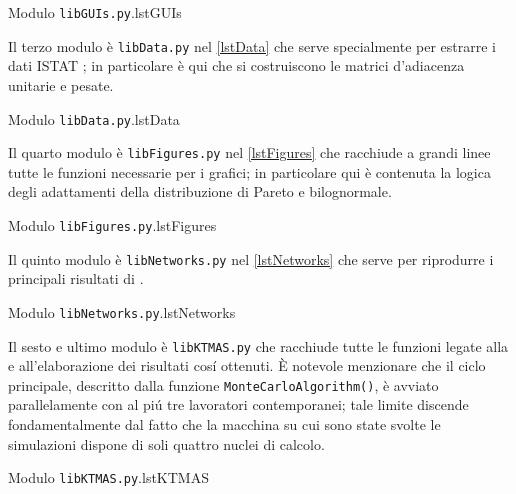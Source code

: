         {\texorpdfstring{Modulo \texttt{libGUIs.py}.}{Modulo «libGUIs.py»}}{lstGUIs}

      Il terzo modulo è \texttt{libData.py} nel \cref{lstData} che serve specialmente per estrarre i dati ISTAT \cite{ISTATCensimento1991,ISTATLimiti1991,ISTATPendolarismo1991}; in particolare è qui che si costruiscono le matrici d'adiacenza unitarie e pesate.
  
        {\texorpdfstring{Modulo \texttt{libData.py}.}{Modulo «libData.py»}}{lstData}

      Il quarto modulo è \texttt{libFigures.py} nel \cref{lstFigures} che racchiude a grandi linee tutte le funzioni necessarie per i grafici; in particolare qui è contenuta la logica degli adattamenti della distribuzione di Pareto e bilognormale.
  
        {\texorpdfstring{Modulo \texttt{libFigures.py}.}{Modulo «libFigures.py»}}{lstFigures}

      Il quinto modulo è \texttt{libNetworks.py} nel \cref{lstNetworks} che serve per riprodurre i principali risultati di \cite{DeMontis2007}.
  
        {\texorpdfstring{Modulo \texttt{libNetworks.py}.}{Modulo «libNetworks.py»}}{lstNetworks}

      Il sesto e ultimo modulo è \texttt{libKTMAS.py} che racchiude tutte le funzioni legate alla \TCSMA{} e all'elaborazione dei risultati cosí ottenuti. È notevole menzionare che il ciclo principale, descritto dalla funzione \texttt{Mon\-te\-Car\-lo\-Al\-go\-ri\-thm()}, è avviato parallelamente con al piú tre lavoratori contemporanei; tale limite discende fondamentalmente dal fatto che la macchina su cui sono state svolte le simulazioni dispone di soli quattro nuclei di calcolo.
  
        {\texorpdfstring{Modulo \texttt{libKTMAS.py}.}{Modulo «libKTMAS.py»}}{lstKTMAS}

